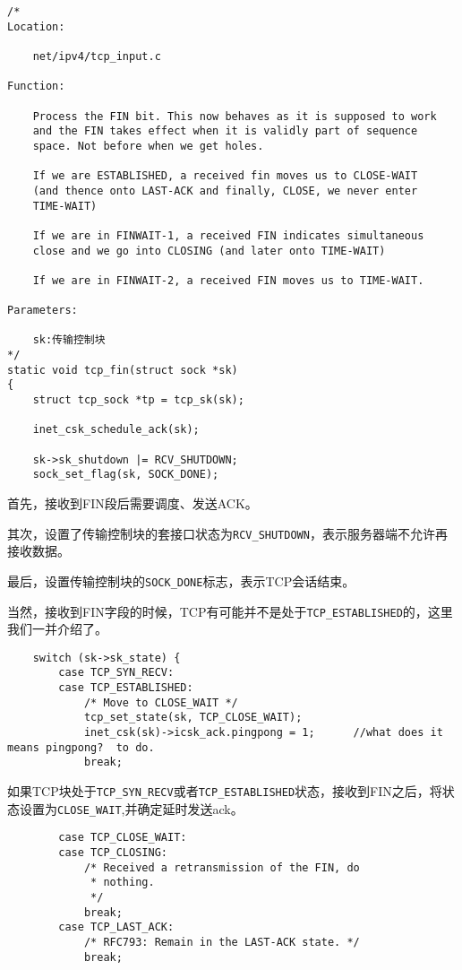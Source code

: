 \begin{verbatim}
/*
Location:

    net/ipv4/tcp_input.c

Function:

    Process the FIN bit. This now behaves as it is supposed to work
    and the FIN takes effect when it is validly part of sequence
    space. Not before when we get holes.
 
    If we are ESTABLISHED, a received fin moves us to CLOSE-WAIT
    (and thence onto LAST-ACK and finally, CLOSE, we never enter
    TIME-WAIT)
 
    If we are in FINWAIT-1, a received FIN indicates simultaneous
    close and we go into CLOSING (and later onto TIME-WAIT)
 
    If we are in FINWAIT-2, a received FIN moves us to TIME-WAIT.

Parameters:

    sk:传输控制块
*/
static void tcp_fin(struct sock *sk)
{
    struct tcp_sock *tp = tcp_sk(sk);

    inet_csk_schedule_ack(sk);

    sk->sk_shutdown |= RCV_SHUTDOWN;
    sock_set_flag(sk, SOCK_DONE);
\end{verbatim}

            首先，接收到FIN段后需要调度、发送ACK。

            其次，设置了传输控制块的套接口状态为\texttt{RCV_SHUTDOWN}，表示服务器端不允许再接收数据。
    
            最后，设置传输控制块的\texttt{SOCK_DONE}标志，表示TCP会话结束。

            当然，接收到FIN字段的时候，TCP有可能并不是处于\texttt{TCP_ESTABLISHED}的，这里我们一并介绍了。

\begin{verbatim}
    switch (sk->sk_state) {
        case TCP_SYN_RECV:
        case TCP_ESTABLISHED:
            /* Move to CLOSE_WAIT */
            tcp_set_state(sk, TCP_CLOSE_WAIT);
            inet_csk(sk)->icsk_ack.pingpong = 1;      //what does it means pingpong?  to do.
            break;
\end{verbatim}

            如果TCP块处于\texttt{TCP_SYN_RECV}或者\texttt{TCP_ESTABLISHED}状态，接收到FIN之后，将状态设置为\texttt{CLOSE_WAIT},并确定延时发送ack。
\begin{verbatim}
        case TCP_CLOSE_WAIT:
        case TCP_CLOSING:
            /* Received a retransmission of the FIN, do
             * nothing.
             */
            break;
        case TCP_LAST_ACK:
            /* RFC793: Remain in the LAST-ACK state. */
            break;
\end{verbatim}

